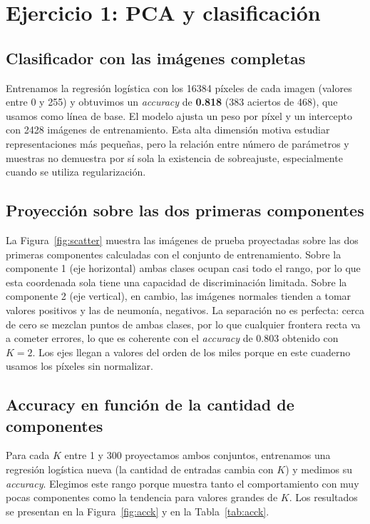 \documentclass[11pt,a4paper]{article}
\newcommand{\acc}{\emph{accuracy}}
\begin{document}
\section{Ejercicio 1: PCA y clasificación}
\subsection{Clasificador con las imágenes completas}

Entrenamos la regresión logística con los 16384 píxeles de cada imagen (valores entre 0 y 255) y obtuvimos
un \acc{} de \textbf{0.818} (383 aciertos de 468), que usamos como línea de base. El modelo ajusta
un peso por píxel y un intercepto con 2428 imágenes de entrenamiento. Esta alta dimensión motiva estudiar
representaciones más pequeñas, pero la relación entre número de parámetros y muestras no demuestra por
sí sola la existencia de sobreajuste, especialmente cuando se utiliza regularización.

\subsection{Proyección sobre las dos primeras componentes}

La Figura~\ref{fig:scatter} muestra las imágenes de prueba proyectadas sobre las dos primeras componentes
calculadas con el conjunto de entrenamiento. Sobre la componente 1 (eje horizontal) ambas clases ocupan casi
todo el rango, por lo que esta coordenada sola tiene una capacidad de discriminación limitada. Sobre la componente 2 (eje
vertical), en cambio, las imágenes normales tienden a tomar valores positivos y las de neumonía, negativos.
La separación no es perfecta: cerca de cero se mezclan puntos de ambas clases, por lo que cualquier frontera
recta va a cometer errores, lo que es coherente con el \acc{} de 0.803 obtenido con $K=2$. Los ejes llegan a
valores del orden de los miles porque en este cuaderno usamos los píxeles sin normalizar.

\subsection{Accuracy en función de la cantidad de componentes}

Para cada $K$ entre 1 y 300 proyectamos ambos conjuntos, entrenamos una regresión logística nueva (la
cantidad de entradas cambia con $K$) y medimos su \acc{}. Elegimos este rango porque muestra tanto el
comportamiento con muy pocas componentes como la tendencia para valores grandes de $K$. Los resultados se
presentan en la Figura~\ref{fig:acck} y en la Tabla~\ref{tab:acck}.
\end{document}

